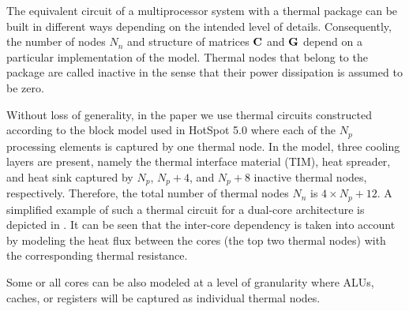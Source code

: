 The equivalent circuit of a multiprocessor system with a thermal package can be built in different ways depending on the intended level of details. Consequently, the number of nodes $N_n$ and structure of matrices $\mathbf{C}$ and $\mathbf{G}$ depend on a particular implementation of the model. Thermal nodes that belong to the package are called inactive in the sense that their power dissipation is assumed to be zero.

Without loss of generality, in the paper we use thermal circuits constructed according to the block model used in HotSpot 5.0 \cite{huang2008} where each of the $N_p$ processing elements is captured by one thermal node. In the model, three cooling layers are present, namely the thermal interface material (TIM), heat spreader, and heat sink captured by $N_p$, $N_p + 4$, and $N_p + 8$ inactive thermal nodes, respectively. Therefore, the total number of thermal nodes $N_n$ is $4 \times N_p + 12$. A simplified example of such a thermal circuit for a dual-core architecture is depicted in . It can be seen that the inter-core dependency is taken into account by modeling the heat flux between the cores (the top two thermal nodes) with the corresponding thermal resistance.

Some or all cores can be also modeled at a  level of granularity where ALUs, caches, or registers will be captured as individual thermal nodes.
